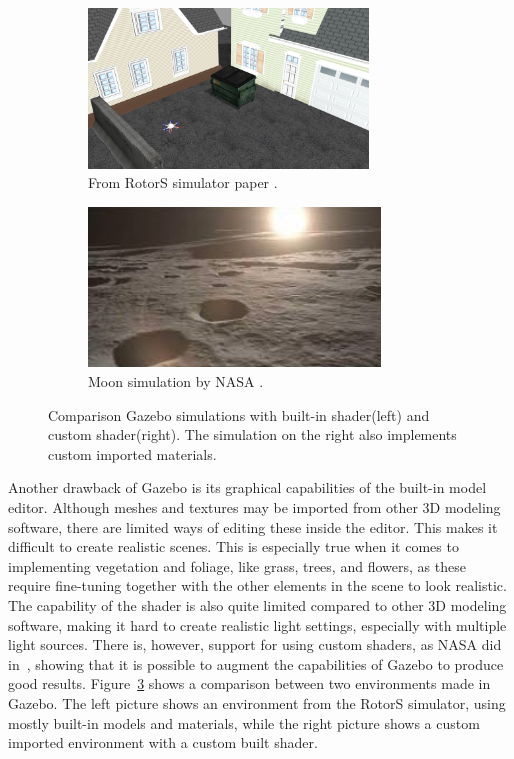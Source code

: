 \begin{figure}[!htb]
    \centering
    \begin{subfigure}{0.49\textwidth}
        \centering
        \includegraphics[height=4.25cm]{rapport/fig/Simulator/A-screenshot-of-the-RotorS-simulator-The-scene-is-built-up-from-Gazebo-default-models.png}
        \caption{From RotorS simulator paper \cite{RotorS}.}
        \label{fig:A}
    \end{subfigure}
    \begin{subfigure}{0.49\textwidth}
        \centering
        \includegraphics[height=4.25cm]{rapport/fig/Simulator/gazebomoon.jpg}
        \caption{Moon simulation by NASA \cite{NASAGazeboppt}.}
        \label{fig:NASA_Gazebo_moon}
    \end{subfigure}
    \caption{Comparison Gazebo simulations with built-in shader(left) and custom shader(right). The simulation on the right also implements custom imported materials.}
    \label{fig:Gazebo_imgs}
\end{figure}

Another drawback of Gazebo is its graphical capabilities of the built-in model editor. Although meshes and textures may be imported from other 3D modeling software, there are limited ways of editing these inside the editor. This makes it difficult to create realistic scenes. This is especially true when it comes to implementing vegetation and foliage, like grass, trees, and flowers, as these require fine-tuning together with the other elements in the scene to look realistic. The capability of the shader is also quite limited compared to other 3D modeling software, making it hard to create realistic light settings, especially with multiple light sources. There is, however, support for using custom shaders, as NASA did in~\cite{NASAGazeboppt}, showing that it is possible to augment the capabilities of Gazebo to produce good results. Figure~\ref{fig:Gazebo_imgs} shows a comparison between two environments made in Gazebo. The left picture shows an environment from the RotorS simulator, using mostly built-in models and materials, while the right picture shows a custom imported environment with a custom built shader.

